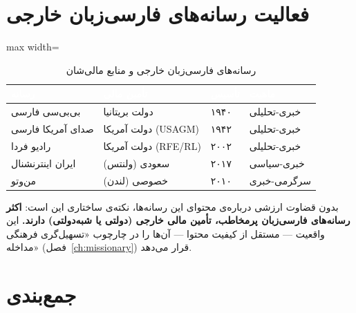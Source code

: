 \section{فعالیت رسانه‌های فارسی‌زبان خارجی}
\label{sec:app-c-media}


\begin{table}[htbp]
\centering
\caption{رسانه‌های فارسی‌زبان خارجی و منابع مالی‌شان}
\label{tab:app-c-media}
\begin{adjustbox}{max width=\linewidth}
\begin{tabularx}{\linewidth}{
    >{\raggedleft\arraybackslash}p{3cm}
    >{\raggedleft\arraybackslash}p{5cm}
    >{\centering\arraybackslash}p{1.5cm}
    >{\raggedleft\arraybackslash}X
}
\toprule
\rowcolor{PrimaryDeep}
\textcolor{white}{\textbf{رسانه}} &
\textcolor{white}{\textbf{تأمین مالی}} &
\textcolor{white}{\textbf{تأسیس}} &
\textcolor{white}{\textbf{ماهیت}} \\
\midrule
بی‌بی‌سی فارسی & دولت بریتانیا & ۱۹۴۰ & خبری-تحلیلی \\
\rowcolor{NeutralLight}
صدای آمریکا فارسی & دولت آمریکا (USAGM) & ۱۹۴۲ & خبری-تحلیلی \\
رادیو فردا & دولت آمریکا (RFE/RL) & ۲۰۰۲ & خبری-تحلیلی \\
\rowcolor{NeutralLight}
ایران اینترنشنال & سعودی (ولنتس) & ۲۰۱۷ & خبری-سیاسی \\
من‌وتو & خصوصی (لندن) & ۲۰۱۰ & سرگرمی-خبری \\
\bottomrule
\end{tabularx}
\end{adjustbox}
\end{table}

بدون قضاوت ارزشی درباره‌ی محتوای این رسانه‌ها، نکته‌ی ساختاری این است: \textbf{اکثر رسانه‌های فارسی‌زبان پرمخاطب، تأمین مالی خارجی (دولتی یا شبه‌دولتی) دارند.} این واقعیت — مستقل از کیفیت محتوا — آن‌ها را در چارچوب «تسهیل‌گری فرهنگی مداخله» (فصل~\ref{ch:missionary}) قرار می‌دهد.

\section{جمع‌بندی}
\label{sec:app-c-conclusion}

